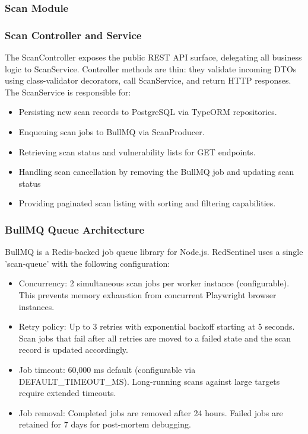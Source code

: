 \subsubsection{Scan Module}
\subsubsection{ Scan Controller and Service}
The ScanController exposes the public REST API surface, delegating all business logic to ScanService. Controller methods are thin: they validate incoming DTOs using class-validator decorators, call ScanService, and return HTTP responses. The ScanService is responsible for:
\begin{itemize}[itemsep=2pt, topsep=-15pt]
    \item Persisting new scan records to PostgreSQL via TypeORM repositories.
    \item Enqueuing scan jobs to BullMQ via ScanProducer.
    \item Retrieving scan status and vulnerability lists for GET endpoints.
    \item Handling scan cancellation by removing the BullMQ job and updating scan status
    \item Providing paginated scan listing with sorting and filtering capabilities. 
\end{itemize}
\subsubsection{ BullMQ Queue Architecture}
BullMQ is a Redis-backed job queue library for Node.js. RedSentinel uses a single 'scan-queue' with the following configuration:
\begin{itemize}[itemsep=2pt, topsep=-15pt]
    \item Concurrency: 2 simultaneous scan jobs per worker instance (configurable). This prevents memory exhaustion from concurrent Playwright browser instances.
    \item Retry policy: Up to 3 retries with exponential backoff starting at 5 seconds. Scan jobs that fail after all retries are moved to a failed state and the scan record is updated accordingly.
    \item Job timeout: 60,000 ms default (configurable via DEFAULT\_\allowbreak TIMEOUT\_\allowbreak MS). Long-running scans against large targets require extended timeouts.
    \item Job removal: Completed jobs are removed after 24 hours. Failed jobs are retained for 7 days for post-mortem debugging.
\end{itemize}

